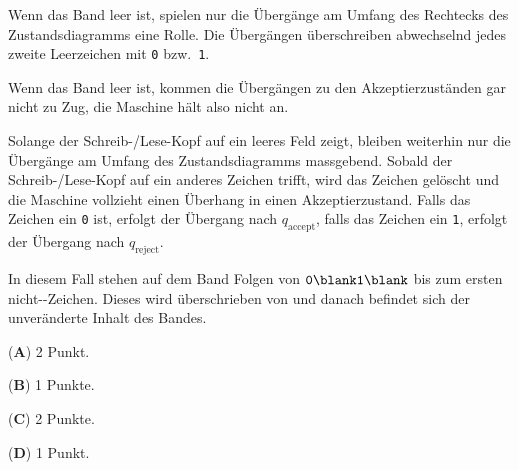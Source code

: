 \begin{loesung}
\begin{teilaufgaben}
\item 
Wenn das Band leer ist, spielen nur die Übergänge am Umfang des Rechtecks
des Zustandsdiagramms eine Rolle.
Die Übergängen überschreiben abwechselnd jedes zweite Leerzeichen mit
\texttt{0} bzw.~\texttt{1}.
\item
Wenn das Band leer ist, kommen die Übergängen zu den Akzeptierzuständen
gar nicht zu Zug, die Maschine hält also nicht an.
\item
Solange der Schreib-/Lese-Kopf auf ein leeres Feld zeigt, bleiben
weiterhin nur die Übergänge am Umfang des Zustandsdiagramms massgebend.
Sobald der Schreib-/Lese-Kopf auf ein anderes Zeichen trifft, wird das
Zeichen gelöscht und die Maschine vollzieht einen Überhang in einen
Akzeptierzustand.
Falls das Zeichen ein \texttt{0} ist, erfolgt der Übergang nach
$q_\text{accept}$, falls das Zeichen ein \texttt{1}, erfolgt der Übergang
nach $q_{\text{reject}}$.
\item
In diesem Fall stehen auf dem Band Folgen von $\texttt{0\blank1\blank}$
bis zum ersten nicht-\blank-Zeichen.
Dieses wird überschrieben von \blank{} und danach befindet sich der
unveränderte Inhalt des Bandes.
\qedhere
\end{teilaufgaben}
\end{loesung}

\begin{bewertung}
\begin{teilaufgaben}
\item
({\bf A}) 2 Punkt.
\item
({\bf B}) 1 Punkte.
\item
({\bf C}) 2 Punkte.
\item
({\bf D}) 1 Punkt.
\end{teilaufgaben}
\end{bewertung}

